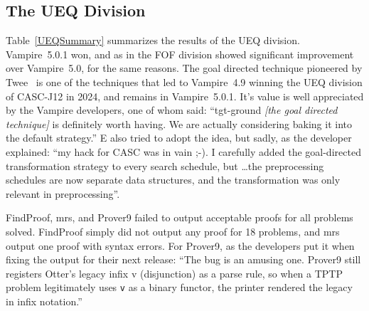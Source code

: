 \documentclass[aic]{iosart2x}
\newcommand{\smalltt}[1]{\small \texttt{#1}}
\begin{document}
% 
% 
% 
\subsection{The UEQ Division}
\label{UEQ}

Table~\ref{UEQSummary} summarizes the results of the UEQ division.
Vampire~5.0.1 won, and as in the FOF division showed significant improvement over Vampire~5.0,
for the same reasons.
The goal directed technique pioneered by Twee~\cite{Sma21} is one of the techniques that led
to Vampire~4.9 winning the UEQ division of CASC-J12 in 2024, and remains in Vampire~5.0.1.
It's value is well appreciated by the Vampire developers, one of whom said: ``tgt-ground 
{\em [the goal directed technique]} is definitely worth having. We are actually considering 
baking it into the default strategy.''
E also tried to adopt the idea, but sadly, as the developer explained: ``my hack for CASC was 
in vain ;-). I carefully added the goal-directed transformation strategy to every search schedule,
but \ldots the preprocessing schedules are now separate data structures, and the transformation 
was only relevant in preprocessing''.

FindProof, mrs, and Prover9 failed to output acceptable proofs for all problems solved.
FindProof simply did not output any proof for 18 problems, and mrs output one proof with syntax 
errors. 
For Prover9, as the developers put it when fixing the output for their next release: ``The bug 
is an amusing one. Prover9 still registers Otter’s legacy infix v (disjunction) as a parse rule, 
so when a TPTP problem legitimately uses \smalltt{v} as a binary functor, the printer rendered 
the legacy in infix notation.''
\end{document}
